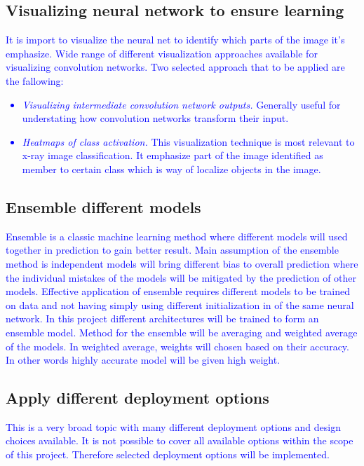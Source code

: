 \documentclass[12pt, twoside, a4paper]{article}
\begin{document}
\subsection{Visualizing neural network to ensure learning}
\textcolor{blue}{
It is import to visualize the neural net to identify which parts of the image it's emphasize. Wide range of different visualization approaches available for visualizing convolution networks. Two selected approach that to be applied are the fallowing:
\begin{itemize}
    \item \textit{Visualizing intermediate convolution network outputs.} Generally useful for understating how convolution networks transform their input.
    \item \textit{Heatmaps of class activation.} This visualization technique is most relevant to x-ray image classification. It emphasize part of the image identified as member to certain class which is way of localize objects in the image. 
\end{itemize}
}

\subsection{Ensemble different models}
\textcolor{blue}{Ensemble is a classic machine learning method where different models will used together in prediction to gain better result. Main assumption of the ensemble method is independent models will bring different bias to overall prediction where the individual mistakes of the models will be mitigated by the prediction of other models. Effective application of ensemble requires different models to be trained on data and not having simply using different initialization in of the same neural network. In this project different architectures will be trained to form an ensemble model. Method for the ensemble will be averaging and weighted average of the models. In weighted average, weights will chosen based on their accuracy. In other words highly accurate model will be given high weight.}

\subsection{Apply different deployment options}
\textcolor{blue}{This is a very broad topic with many different deployment options and design choices available. It is not possible to cover all available options within the scope of this project. Therefore selected deployment options will be implemented.}
\end{document}
